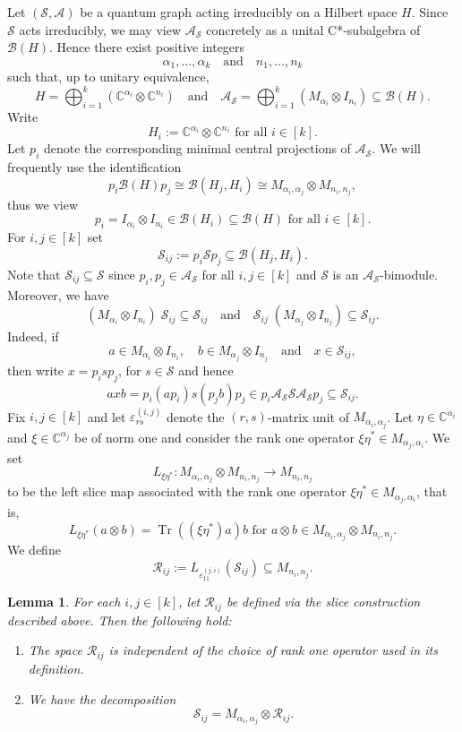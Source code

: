 \documentclass[11pt]{amsart}
\numberwithin{equation}{section}
\theoremstyle{plain}
\newtheorem{lemma}[theorem]{Lemma}
\theoremstyle{definition}
\theoremstyle{remark}
\newcommand{\A}{{\mathcal{A}}}
\newcommand{\B}{{\mathcal{B}}}
\newcommand{\R}{{\mathcal{R}}}
\renewcommand{\S}{{\mathcal{S}}}
\newcommand{\eps}{\varepsilon}
\def\al{\alpha}
\newcommand{\bC}{\mathbb{C}}
\newcommand{\foral}{\text{ for all }}
\newcommand{\qand}{\quad\text{and}\quad}
\begin{document}
Let $(\S,\A)$ be a quantum graph acting irreducibly on a Hilbert space $H$. Since $\S$ acts irreducibly, we may view $\A_{\S}$ concretely as a unital C*-subalgebra of $\B(H)$. Hence there exist positive integers
\[
\alpha_1,\dots,\alpha_k \qand n_1,\dots,n_k
\]
such that, up to unitary equivalence,
\[
H=\bigoplus_{i=1}^k (\bC^{\alpha_i}\otimes \bC^{n_i})
\qand
\A_{\S}
=
\bigoplus_{i=1}^k (M_{\alpha_i}\otimes I_{n_i})
\subseteq \B(H).
\]
Write
\[
H_i:=\bC^{\alpha_i}\otimes \bC^{n_i}
\foral i\in [k].
\]
Let $p_i $ denote the corresponding minimal central projections of $\A_{\S}$.
We will frequently use the identification 
\[
p_i \B(H) p_j \cong \B(H_j, H_i) \cong M_{\alpha_i,\alpha_j}\otimes M_{n_i,n_j},
\]
thus we view 
\[
p_i=I_{\alpha_i}\otimes I_{n_i}\in \B(H_i)\subseteq \B(H) \foral i\in [k].
\]
For $i,j\in [k]$ set
\[
\S_{ij}:=p_i\S p_j \subseteq \B(H_j,H_i).
\]
Note that $\S_{ij}\subseteq \S$ since $p_i,p_j \in \A_\S$ for all $i,j\in [k]$
and $\S$ is an $\A_{\S}$-bimodule. Moreover, we have
\[
(M_{\alpha_i}\otimes I_{n_i} ) \; \S_{ij } \subseteq \S_{ij} \qand \S_{ij}\;(M_{\alpha_j}\otimes I_{n_j}) \subseteq \S_{ij}.
\]
Indeed, if
\[
a\in M_{\alpha_i}\otimes I_{n_i},\quad b\in M_{\alpha_j}\otimes I_{n_j} \qand x\in \S_{ij},
\]
then write $ x = p_isp_j$, for $ s\in \S$ and hence
\[
axb
=
p_i (a p_i) s (p_j b) p_j
\in p_i \A_\S \S  \A_\S p_j \subseteq 
\S_{ij}.
\]
Fix $i,j\in [k]$ and let $\eps^{(i,j)}_{rs}$ denote the $(r,s)$-matrix unit of
$M_{\alpha_i,\alpha_j}$.
Let $ \eta \in \bC^{\al_i}$ and $ \xi\in \bC^{\al_j}$ be of norm one and consider the rank one operator $\xi\eta^*\in M_{\al_j,\al_i}$.
We set
\[
L_{\xi\eta^*} \colon M_{\alpha_i,\alpha_j}\otimes M_{n_i,n_j}\to M_{n_i,n_j}
\]
to be the left slice map associated with the rank one operator $\xi\eta^*\in M_{\alpha_j,\alpha_i}$, that is,
\[
L_{\xi\eta^*}(a\otimes b)=\operatorname{Tr}((\xi \eta^*) a) b \text{ for } a\otimes b \in  M_{\alpha_i,\alpha_j}\otimes M_{n_i,n_j}.
\]
We define
\[
\R_{ij}:=L_{\eps_{11}^{(j,i)}}(\S_{ij})\subseteq M_{n_i,n_j}.
\]

\begin{lemma}\label{lem:rij_structure}
For each $i,j\in [k]$, let $\R_{ij}$ be defined via the slice construction described above. Then the following hold:
\begin{enumerate}
\item The space $\R_{ij}$ is independent of the choice of rank one operator used in its definition.
\item We have the decomposition
\[
\S_{ij}
=
M_{\alpha_i,\alpha_j}\otimes \R_{ij}.
\]
\end{enumerate}
\end{lemma}
\end{document}
